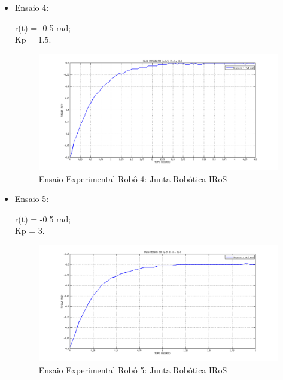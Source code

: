 \documentclass[12pt,oneside,a4paper, chapter=TITLE, section = TITLE, english, brazil]{abntex2}
\begin{document}
\begin{itemize}
\item Ensaio 4:


r(t) = -0.5 rad;\\
Kp = 1.5.\\


\begin{figure}[h] %
\centering
\includegraphics[scale=0.42]{./imagens/Ensaio2_2_robo}
\caption[Ensaio Experimental Robô 4: Junta Robótica IRoS]{Ensaio Experimental Robô 4: Junta Robótica IRoS}
\label{fig:ensaio2_2_robo}
\end{figure}


\item Ensaio 5:

 
r(t) = -0.5 rad;\\
Kp = 3.\\

\begin{figure}[h] %
\centering
\includegraphics[scale=0.43]{./imagens/Ensaio3_1_robo}
\caption[Ensaio Experimental Robô 5: Junta Robótica IRoS]{Ensaio Experimental Robô 5: Junta Robótica IRoS}
\label{fig:ensaio3_1_robo}
\end{figure}



\end{itemize}
\end{document}
